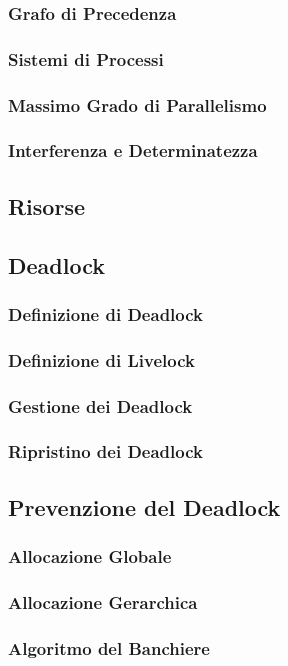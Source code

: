 \documentclass[a4paper]{article}
\begin{document}
\subsubsection*{Grafo di Precedenza}
\subsubsection*{Sistemi di Processi}
\subsubsection*{Massimo Grado di Parallelismo}
\subsubsection*{Interferenza e Determinatezza}
\subsection{Risorse}
\subsection{Deadlock}
\subsubsection*{Definizione di Deadlock}
\subsubsection*{Definizione di Livelock}
\subsubsection*{Gestione dei Deadlock}
\subsubsection*{Ripristino dei Deadlock}
\subsection{Prevenzione del Deadlock}
\subsubsection*{Allocazione Globale}
\subsubsection*{Allocazione Gerarchica}
\subsubsection*{Algoritmo del Banchiere}
\end{document}
